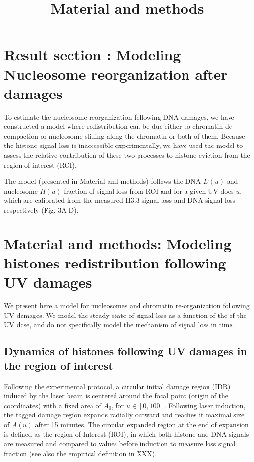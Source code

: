 \documentclass[12pt]{article}
\begin{document}
	
\title{ Material and methods}
\maketitle

\section{Result section : Modeling Nucleosome reorganization after damages}

To estimate the nucleosome reorganization following DNA damages, we have constructed a model where redistribution can be due either to chromatin de-compaction or nucleosome sliding along the chromatin or both of them.  Because the histone signal loss is inaccessible experimentally, we have used the model to assess the relative contribution of these two processes to histone eviction from the region of interest (ROI).

The model (presented in Material and methods) follows the DNA $D(u)$ and nucleosome $H(u)$ fraction of signal loss from ROI and for a given UV does $u$, which are calibrated from the measured  H3.3 signal loss and DNA signal loss respectively (Fig. 3A-D). 


\section{Material and methods: Modeling  histones redistribution following UV damages}
We present here a model for nucleosomes and chromatin re-organization following UV damages. We model the steady-state of signal loss as a function of the of the UV dose, and do not specifically model the mechanism of signal loss in time. 

\subsection{Dynamics of histones following UV damages in the region of interest}
Following the experimental protocol, a circular initial damage region (IDR) induced by the laser beam is centered around the focal point (origin of the coordinates) with a fixed area of $A_0$, for $u\in[0, 100]$. Following laser induction, the tagged damage region expands radially outward and reaches it maximal size of $A(u)$ after 15 minutes. The circular expanded region at the end of expansion is defined as the region of Interest (ROI), in which both histone and DNA signals are measured and compared to values before induction to measure loss signal fraction (see also the empirical definition in XXX). 
\end{document}

